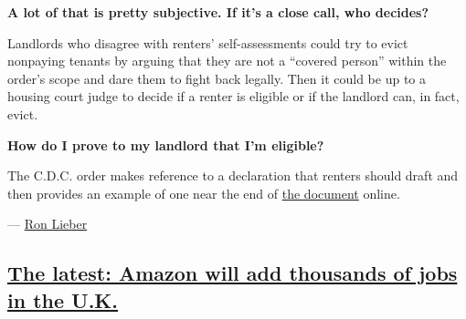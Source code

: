 \textbf{A lot of that is pretty subjective. If it's a close call, who
decides?}

Landlords who disagree with renters' self-assessments could try to evict
nonpaying tenants by arguing that they are not a ``covered person''
within the order's scope and dare them to fight back legally. Then it
could be up to a housing court judge to decide if a renter is eligible
or if the landlord can, in fact, evict.

\textbf{How do I prove to my landlord that I'm eligible?}

The C.D.C. order makes reference to a declaration that renters should
draft and then provides an example of one near the end of
\href{https://s3.amazonaws.com/public-inspection.federalregister.gov/2020-19654.pdf}{the
document} online.

--- \href{https://www.nytimes3xbfgragh.onion/by/ron-lieber}{Ron Lieber}

\hypertarget{the-latest-amazon-will-add-thousands-of-jobs-in-the-uk}{%
\subsection{\texorpdfstring{\protect\hyperlink{the-latest-amazon-will-add-thousands-of-jobs-in-the-uk}{The
latest: Amazon will add thousands of jobs in the
U.K.}}{The latest: Amazon will add thousands of jobs in the U.K.}}\label{the-latest-amazon-will-add-thousands-of-jobs-in-the-uk}}

